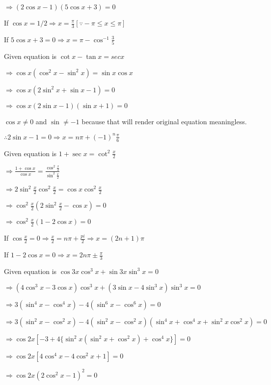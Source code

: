  $\Rightarrow (2\cos x -1)(5\cos x + 3) = 0$

  If $\cos x = 1/2 \Rightarrow x = \frac{\pi}{3} [\because -\pi \leq x\leq \pi]$

  If $5\cos x + 3 = 0 \Rightarrow x = \pi - \cos^{-1}\frac{3}{5}$

\item Given equation is $\cot x - \tan x = sec x$

  $\Rightarrow \cos x(\cos^2x - \sin^2x) = \sin x\cos x$

  $\Rightarrow \cos x(2\sin^2x + \sin x - 1) = 0$

  $\Rightarrow \cos x(2\sin x - 1)(\sin x + 1) = 0$

  $\cos x\neq 0$ and $\sin \neq -1$ because that will render original equation meaningless.

  $\therefore 2\sin x - 1= 0 \Rightarrow x = n\pi + (-1)^n\frac{\pi}{6}$

\item Given equation is $1 + \sec x = \cot^2\frac{x}{2}$

  $\Rightarrow \frac{1 + \cos x}{\cos x} = \frac{\cos^2\frac{x}{2}}{\sin^2\frac{x}{2}}$

  $\Rightarrow 2\sin^2\frac{x}{2}\cos^2\frac{x}{2} = \cos x\cos^2\frac{x}{2}$

  $\Rightarrow \cos^2\frac{x}{2}\left(2\sin^2\frac{x}{2} - \cos x\right) = 0$

  $\Rightarrow \cos^2\frac{x}{2}\left(1 - 2\cos x\right) = 0$

  If $\cos\frac{x}{2} = 0 \Rightarrow \frac{x}{2} = n\pi + \frac{pi}{2} \Rightarrow x = (2n + 1)\pi$

  If $1 - 2\cos x =  0\Rightarrow x = 2n\pi \pm \frac{\pi}{3}$

\item Given equation is $\cos3x\cos^3x + \sin3x\sin^3x = 0$

  $\Rightarrow (4\cos^3x - 3\cos x)\cos^3x + (3\sin x - 4\sin^3x)\sin^3x = 0$

  $\Rightarrow 3(\sin^4x - \cos^4x) - 4(\sin^6x - \cos^6x) = 0$

  $\Rightarrow 3(\sin^2x - \cos^2x) - 4(\sin^2x - \cos^2x)(\sin^4x + \cos^4x + \sin^2x\cos^2x) = 0$

  $\Rightarrow \cos2x[-3 + 4\{\sin^2x(\sin^2x + \cos^2x) + \cos^4x\}] = 0$

  $\Rightarrow \cos 2x[4\cos^4x - 4\cos^2x + 1] = 0$

  $\Rightarrow \cos2x(2\cos^2x - 1)^2 = 0$

